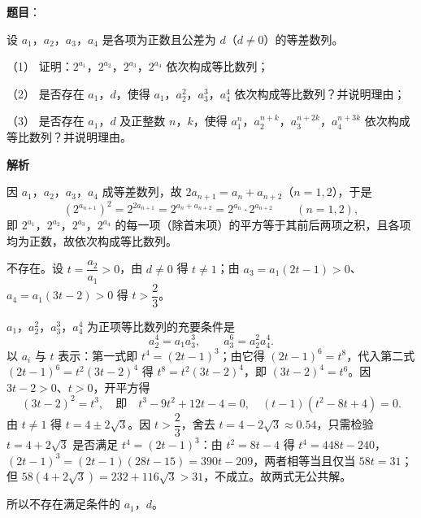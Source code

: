 \begin{answer}

\textbf{题目}：

设 \(a_{1}\)，\(a_{2}\)，\(a_{3}\)，\(a_{4}\) 是各项为正数且公差为 \(d\)（\(d\neq 0\)）的等差数列。

（1） 证明：\(2^{a_{1}}\)，\(2^{a_{2}}\)，\(2^{a_{3}}\)，\(2^{a_{4}}\) 依次构成等比数列；

（2） 是否存在 \(a_{1}\)，\(d\)，使得 \(a_{1}\)，\(a_{2}^{2}\)，\(a_{3}^{3}\)，\(a_{4}^{4}\) 依次构成等比数列？并说明理由；

（3） 是否存在 \(a_{1}\)，\(d\) 及正整数 \(n\)，\(k\)，使得 \(a_{1}^{n}\)，\(a_{2}^{n+k}\)，\(a_{3}^{n+2k}\)，\(a_{4}^{n+3k}\) 依次构成等比数列？并说明理由。

\textbf{解析}


因 \(a_{1}\)，\(a_{2}\)，\(a_{3}\)，\(a_{4}\) 成等差数列，故 \(2a_{n+1}=a_{n}+a_{n+2}\)（\(n=1,2\)），于是
\nopagebreak[4]
\[
\left(2^{a_{n+1}}\right)^{2}=2^{2a_{n+1}}=2^{a_{n}+a_{n+2}}=2^{a_{n}}\cdot2^{a_{n+2}}\qquad(n=1,2),
\]
即 \(2^{a_{1}}\)，\(2^{a_{2}}\)，\(2^{a_{3}}\)，\(2^{a_{4}}\) 的每一项（除首末项）的平方等于其前后两项之积，且各项均为正数，故依次构成等比数列。


不存在。设 \(t=\dfrac{a_{2}}{a_{1}}>0\)，由 \(d\ne0\) 得 \(t\ne1\)；由 \(a_{3}=a_{1}(2t-1)>0\)、\(a_{4}=a_{1}(3t-2)>0\) 得 \(t>\dfrac{2}{3}\)。

\(a_{1}\)，\(a_{2}^{2}\)，\(a_{3}^{3}\)，\(a_{4}^{4}\) 为正项等比数列的充要条件是
\nopagebreak[4]
\[
a_{2}^{4}=a_{1}a_{3}^{3},\qquad a_{3}^{6}=a_{2}^{2}a_{4}^{4}.
\]
以 \(a_{i}\) 与 \(t\) 表示：第一式即 \(t^{4}=(2t-1)^{3}\)；由它得 \((2t-1)^{6}=t^{8}\)，代入第二式 \((2t-1)^{6}=t^{2}(3t-2)^{4}\) 得 \(t^{8}=t^{2}(3t-2)^{4}\)，即 \((3t-2)^{4}=t^{6}\)。因 \(3t-2>0\)、\(t>0\)，开平方得
\nopagebreak[4]
\[
(3t-2)^{2}=t^{3},\quad\text{即}\quad t^{3}-9t^{2}+12t-4=0,\quad (t-1)(t^{2}-8t+4)=0.
\]
由 \(t\ne1\) 得 \(t=4\pm2\sqrt{3}\)。因 \(t>\dfrac{2}{3}\)，舍去 \(t=4-2\sqrt{3}\approx0.54\)，只需检验 \(t=4+2\sqrt{3}\) 是否满足 \(t^{4}=(2t-1)^{3}\)：由 \(t^{2}=8t-4\) 得 \(t^{4}=448t-240\)，\((2t-1)^{3}=(2t-1)(28t-15)=390t-209\)，两者相等当且仅当 \(58t=31\)；但 \(58(4+2\sqrt{3})=232+116\sqrt{3}>31\)，不成立。故两式无公共解。

所以不存在满足条件的 \(a_{1}\)，\(d\)。


\end{answer}
